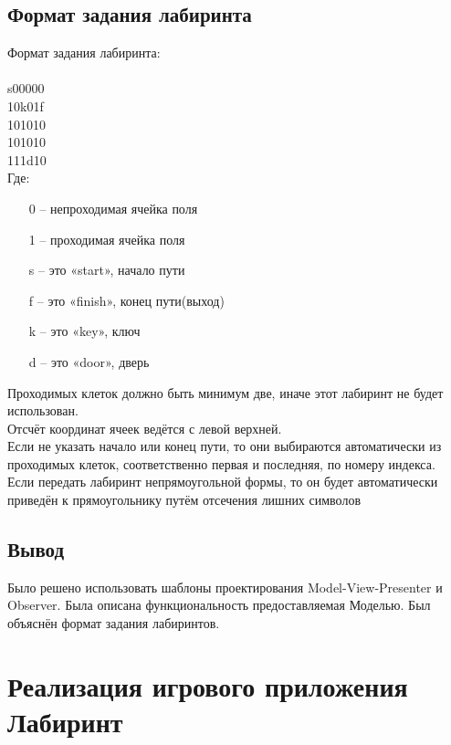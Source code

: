 \subsection{Формат задания лабиринта}

Формат задания лабиринта: \\
\\
s00000\\
10k01f\\
101010\\
101010\\
111d10\\

Где:
\begin{enumerate}
\item[0] -- непроходимая ячейка поля
\item[1] -- проходимая ячейка поля
\item[s] -- это «start», начало пути
\item[f] -- это «finish», конец пути(выход)
\item[k] -- это «key», ключ 
\item[d] -- это «door», дверь
\end{enumerate}

Проходимых клеток должно быть минимум две, иначе этот лабиринт не будет использован.\\

Отсчёт координат ячеек ведётся с левой верхней.\\

Если не указать начало или конец пути, то они выбираются автоматически из проходимых клеток, соответственно первая и последняя, по номеру индекса.\\

Если передать лабиринт непрямоугольной формы, то он будет автоматически приведён к прямоугольнику путём отсечения лишних символов

\subsection{Вывод}

Было решено использовать шаблоны проектирования Model-View-Presenter и Observer. Была описана функциональность предоставляемая Моделью. Был объяснён формат задания лабиринтов.

\section{Реализация игрового приложения Лабиринт}

